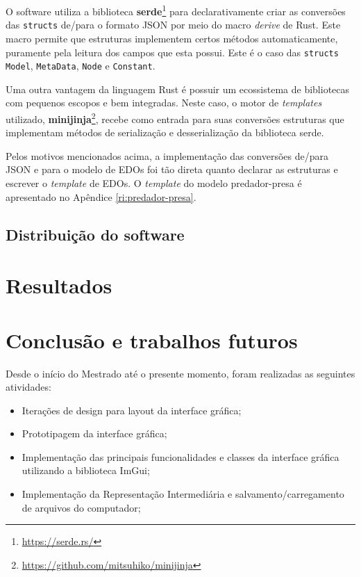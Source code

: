 \documentclass[
	12pt,				%
	openright,			%
	oneside,			%
	a4paper,			%
	main=brazil,
	english,			%
	]{ufsj-abntex2}
\begin{document}
O software utiliza a biblioteca \textbf{serde}\footnote{\href{https://serde.rs/}{https://serde.rs/}} para declarativamente criar as conversões das \texttt{structs} de/para o formato JSON por meio do macro \textit{derive} de Rust. Este macro permite que estruturas implementem certos métodos automaticamente, puramente pela leitura dos campos que esta possui. Este é o caso das \texttt{structs} \texttt{Model}, \texttt{MetaData}, \texttt{Node} e \texttt{Constant}.

Uma outra vantagem da linguagem Rust é possuir um ecossistema de bibliotecas com pequenos escopos e bem integradas. Neste caso, o motor de \textit{templates} utilizado, \textbf{minijinja}\footnote{\href{https://github.com/mitsuhiko/minijinja}{https://github.com/mitsuhiko/minijinja}}, recebe como entrada para suas conversões estruturas que implementam métodos de serialização e desserialização da biblioteca serde.

Pelos motivos mencionados acima, a implementação das conversões de/para JSON e para o modelo de EDOs foi tão direta quanto declarar as estruturas e escrever o \textit{template} de EDOs. O \textit{template} do modelo predador-presa é apresentado no Apêndice \ref{ri:predador-presa}.

\section{Distribuição do software}
\label{sec:distribuicao}


\chapter{Resultados}
\label{chap:resultados}

\chapter{Conclusão e trabalhos futuros}
\label{chap:conclusao}

Desde o início do Mestrado até o presente momento, foram realizadas as seguintes atividades: 
\begin{itemize}
    \item Iterações de design para layout da interface gráfica;
    \item Prototipagem da interface gráfica;
    \item Implementação das principais funcionalidades e classes da interface gráfica utilizando a biblioteca ImGui;
    \item Implementação da Representação Intermediária e salvamento/carregamento de arquivos do computador;
\end{itemize}
\end{document}
